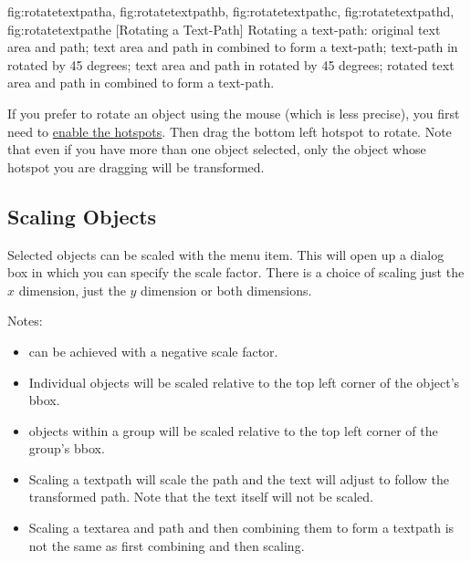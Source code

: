 {
 {fig:rotatetextpatha}{}{},
 {fig:rotatetextpathb}{}{},
 {fig:rotatetextpathc}{}{},
 {fig:rotatetextpathd}{}{},
 {fig:rotatetextpathe}{}{}
}
[Rotating a Text-Path]
{Rotating a text-path: 
 original text area and path; 
 text area and path in
 combined to form a text-path;
 text-path in
 rotated by 45 degrees;
 text area and path in
 rotated by 45 degrees;
 rotated text area and
path in  combined to form a text-path.}

If you prefer to rotate an \gls{object} using the mouse (which is
less precise), you first need to \hyperref[mi:hotspots]{enable the hotspots}.
Then drag the bottom left hotspot to rotate. Note that even if you
have more than one object selected, only the object whose hotspot you
are dragging will be transformed.



\subsection{Scaling Objects}\label{sec:scaleobjects}


Selected \glspl{object} can be scaled with the
 menu item. This will open up a dialog box
in which you can specify the scale factor. There is a choice of
scaling just the $x$ dimension, just the $y$ dimension
or both dimensions.

Notes:
\begin{itemize}
\item {} can be
achieved with a negative scale factor.

\item Individual \glspl*{object} will be
scaled relative to the top left corner of the
object's \gls{bbox}.

\item \Glspl*{object} within a
\gls{group} will be scaled relative to the top left corner
of the group's \gls*{bbox}.

\item Scaling a \gls{textpath} will scale the path and the text
will adjust to follow the transformed path. Note that the text
itself will not be scaled.

\item Scaling a \gls*{textarea} and \gls*{path} and then combining
them to form a \gls*{textpath} is not the same as first combining
and then scaling.
\end{itemize}

